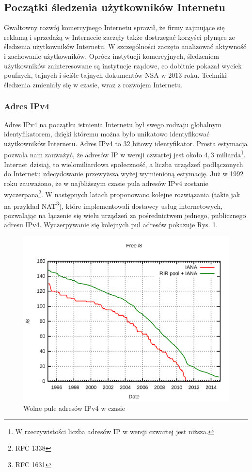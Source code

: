 \subsection{Początki śledzenia użytkowników Internetu}
Gwałtowny rozwój komercyjnego Internetu sprawił, że firmy zajmujące się reklamą
i sprzedażą w Internecie zaczęły także dostrzegać korzyści płynące ze śledzenia
użytkowników Internetu. W szczególności zaczęto analizować aktywność i
zachowanie użytkowników. Oprócz instytucji komercyjnych, śledzeniem użytkowników
zainteresowane są instytucje rządowe, co dobitnie pokazał wyciek poufnych,
tajnych i ściśle tajnych dokumentów NSA w 2013 roku. Techniki śledzenia
zmieniały się w czasie, wraz z rozwojem Internetu.

\subsubsection{Adres IPv4}
Adres IPv4 na początku istnienia Internetu był swego rodzaju globalnym
identyfikatorem, dzięki któremu można było unikatowo identyfikować użytkowników
Internetu. Adres IPv4 to \(32\) bitowy identyfikator. Prosta estymacja pozwala
nam zauważyć, że adresów IP w wersji czwartej jest około \(4,3\)
miliarda\footnote{W rzeczywistości liczba adresów IP w wersji czwartej jest
niższa.}. Internet dzisiaj, to wielomiliardowa społeczność, a liczba urządzeń
podłączonych do Internetu zdecydowanie przewyższa wyżej wymienioną estymację.
Już w 1992 roku zauważono, że w najbliższym czasie pula adresów IPv4 zostanie
wyczerpana\footnote{RFC 1338}. W następnych latach proponowano kolejne
rozwiązania (takie jak na przykład NAT\footnote{RFC 1631}), które implementowali
dostawcy usług internetowych, pozwalając na łączenie się wielu urządzeń za
pośrednictwem jednego, publicznego adresu IPv4. Wyczerpywanie się kolejnych pul
adresów pokazuje Rys. 1.

\begin{figure}
	\includegraphics[width=\textwidth,keepaspectratio]{img/01}
	\caption{Wolne pule adresów IPv4 w czasie}
\end{figure}


